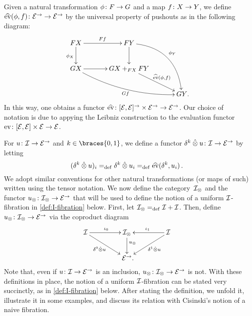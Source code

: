 \documentclass[reqno,10pt,a4paper,oneside,draft]{amsart}
\begin{document}
Given a natural transformation $\phi \co F \to G$ and a map $f \co X \to Y$, we define $\hateval(\phi, f) \co \catE^\to \to \catE^\to$ by the universal property of pushouts as in the following diagram:
\begin{equation} \label{definition-of-hateval}
\begin{aligned}
\xymatrix@C=1.2cm{
  FX
  \ar[r]^{Ff}
  \ar[d]_{\phi_X}
&
  FY
  \ar@/^2pc/[ddr]^{\phi_Y}
  \ar[d]
&\\
  GX
  \ar@/_1pc/[drr]_{Gf}
  \ar[r]
&
  GX +_{FX} FY
  \ar[dr]^-{\hateval(\phi, f)}
&\\&&
  GY
\rlap{.}}
\end{aligned}
\end{equation}
In this way, one obtains a functor $\hateval \co [\catE, \catE]^\to \times \catE^\to \to \catE^\to$.
Our choice of notation is due to appying the Leibniz construction to the evaluation functor $\eval \co [\catE,\catE] \times \calE \to \catE$.

For $u \co \cal{I} \to \catE^\to$ and $k \in \braces{0, 1}$, we define a functor $\kcyl \hatotimes u \co \cal{I} \to \catE^\to$ by letting
\[
  (\kcyl \hatotimes u)_i \defeq \kcyl \hatotimes u_i  \defeq \hateval(\kcyl, u_i) \, .
\]
We adopt similar conventions for other natural transformations (or maps of such) written using the tensor notation.
We now define the category~$\cal{I}_\otimes$ and the functor $u_\otimes \co \cal{I}_\otimes \to \catE^\to$ that will be used to define the notion of a uniform $\cal{I}$-fibration in \cref{def:I-fibration} below.
First, let $\cal{I}_\otimes \defeq \cal{I} + \cal{I}$.
Then, define $u_\otimes \co \cal{I}_\otimes \to \catE^\to$ via the coproduct diagram
\begin{equation}
\label{equ:u-tensor}
\begin{gathered}
\xymatrix@C+2em{
  \cal{I}
  \ar[r]^{\iota_0}
  \ar[dr]_-{\lcyl \hatotimes u}
&
  \cal{I}_\otimes
  \ar[d]^(.4){u_\otimes}
&
  \cal{I}
  \ar[dl]^-{\rcyl \hatotimes u}
  \ar[l]_{\iota_1}
\\&
  \catE^\to
\rlap{.}}
\end{gathered}
\end{equation}
Note that, even if $u \co \cal{I} \to \catE^\to$ is an inclusion, $u_\otimes \co \cal{I}_\otimes \to \catE^\to$ is not.
With these definitions in place, the notion of a uniform $\cal{I}$-fibration can be stated very succinctly, as in \cref{def:I-fibration} below.
After stating the definition, we unfold it, illustrate it in some examples, and discuss its relation with Cisinski's notion of a naive fibration.
\end{document}

